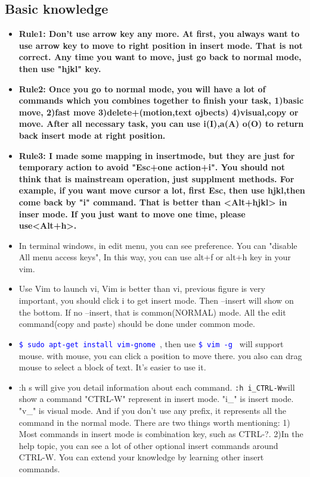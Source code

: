 \documentclass[a4paper,12pt,twoside]{book}
\newcommand{\linuxcommand}[1]{\texttt{\textcolor{blue}{\$ #1 \Pisymbol{psy}{191}}}}
\begin{document}
\subsection{Basic knowledge}

\begin{itemize}
		\item \textbf{Rule1: Don't use arrow key any more. At first, you always want to use arrow key to move to right position in insert mode. That is not correct. Any time you want to move, just go back to normal mode, then use "hjkl" key.}
		\item \textbf{Rule2: Once you go to normal mode, you will have a lot of commands which you combines together to finish your task, 1)basic move, 2)fast move 3)delete+(motion,text ojbects) 4)visual,copy or move. After all necessary task, you can use i(I),a(A) o(O) to return back insert mode at right position.}
		\item \textbf{Rule3: I made some mapping in insertmode, but they are just for temporary action to avoid "Esc+one action+i". You should not think that is mainstream operation, just supplment methods. For example, if you want move cursor a lot, first Esc, then use hjkl,then come back by "i" command. That is better than <Alt+hjkl> in inser mode. If you just want to move one time, please use<Alt+h>.}

		\item In terminal windows, in edit menu, you can see preference. You can "disable All menu access keys", In this way, you can use alt+f or alt+h key in your vim. 

		\item Use Vim to launch vi, Vim is better than vi, previous figure is very important, you should click i to get insert mode. Then --insert will show on the bottom. If no --insert, that is common(NORMAL) mode. All the edit command(copy and paste) should be done under common mode. 

\item \linuxcommand{sudo apt-get install vim-gnome}, then use \linuxcommand{vim -g} will support mouse.  with mouse, you can click a position to move there. you also can drag mouse to select a block of text. It's easier to use it. 

\item :h s will give you detail information about each command. \verb=:h i_CTRL-W=will show a command "CTRL-W" represent in insert mode. "i\_" is insert mode. "v\_" is visual mode. And if you don't use any prefix, it represents all the command in the normal mode. There are two things worth mentioning: 1) Most commands in insert mode is combination key, such as CTRL-?. 2)In the help topic, you can see a lot of other optional insert commands around CTRL-W. You can extend your knowledge by learning other insert commands.


\end{itemize}
\end{document}
